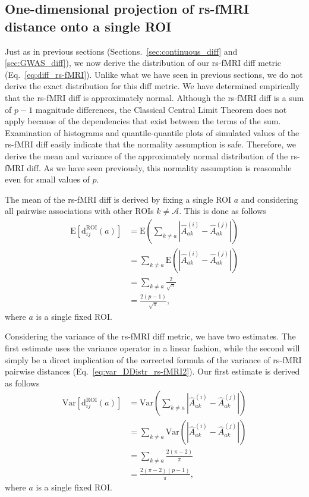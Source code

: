 \documentclass[aos]{imsart}
\begin{document}
\subsection{One-dimensional projection of rs-fMRI distance onto a single ROI}\label{sec:rs-fMRI_diff}

Just as in previous sections (Sections.~\ref{sec:continuous_diff} and \ref{sec:GWAS_diff}), we now derive the distribution of our rs-fMRI diff metric (Eq.~\ref{eq:diff_rs-fMRI}). Unlike what we have seen in previous sections, we do not derive the exact distribution for this diff metric. We have determined empirically that the rs-fMRI diff is approximately normal. Although the rs-fMRI diff is a sum of $p-1$ magnitude differences, the Classical Central Limit Theorem does not apply because of the dependencies that exist between the terms of the sum. Examination of histograms and quantile-quantile plots of simulated values of the rs-fMRI diff easily indicate that the normality assumption is safe. Therefore, we derive the mean and variance of the approximately normal distribution of the rs-fMRI diff. As we have seen previously, this normality assumption is reasonable even for small values of $p$. 

The mean of the rs-fMRI diff is derived by fixing a single ROI $a$ and considering all pairwise associations with other ROIs $k \neq \mathcal{A}$. This is done as follows
%
\begin{equation}\label{eq:rs-fMRI_diffMean}
\begin{aligned}
\text{E}\left[\text{d}^\text{ROI}_{ij}(a)\right] &= \text{E}\left(\sum_{k \neq a} \left|\hat{A}^{(i)}_{ak} - \hat{A}^{(j)}_{ak}\right|\right) \\
&= \sum_{k \neq a} \text{E}\left(\left|\hat{A}^{(i)}_{ak} - \hat{A}^{(j)}_{ak}\right|\right) \\
&= \sum_{k \neq a} \frac{2}{\sqrt{\pi}} \\
&= \frac{2(p-1)}{\sqrt{\pi}},
\end{aligned}
\end{equation}
% 
where $a$ is a single fixed ROI.

Considering the variance of the rs-fMRI diff metric, we have two estimates. The first estimate uses the variance operator in a linear fashion, while the second will simply be a direct implication of the corrected formula of the variance of rs-fMRI pairwise distances (Eq.~\ref{eq:var_DDistr_rs-fMRI2}). Our first estimate is derived as follows
%
\begin{equation}\label{eq:rs-fMRI_diffVar1}
\begin{aligned}
\text{Var}\left[\text{d}^\text{ROI}_{ij}(a)\right] &= \text{Var}\left(\sum_{k \neq a} \left|\hat{A}^{(i)}_{ak} - \hat{A}^{(j)}_{ak}\right|\right) \\
&= \sum_{k \neq a} \text{Var}\left(\left|\hat{A}^{(i)}_{ak} - \hat{A}^{(j)}_{ak}\right|\right) \\
&= \sum_{k \neq a} \frac{2(\pi - 2)}{\pi} \\
&= \frac{2(\pi - 2)(p-1)}{\pi},
\end{aligned}
\end{equation}
%
where $a$ is a single fixed ROI.
\end{document}
